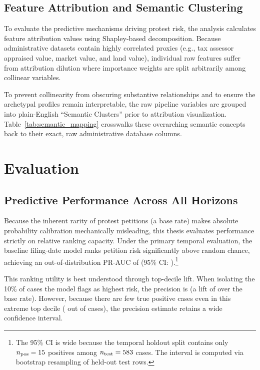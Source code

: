 \documentclass[twoside,11pt]{article}
\begin{document}
\subsection{Feature Attribution and Semantic Clustering}
\label{sec:feature_attribution}

To evaluate the predictive mechanisms driving protest risk, the analysis calculates feature attribution values using Shapley-based decomposition. Because administrative datasets contain highly correlated proxies (e.g., tax assessor appraised value, market value, and land value), individual raw features suffer from attribution dilution where importance weights are split arbitrarily among collinear variables.

To prevent collinearity from obscuring substantive relationships and to ensure the archetypal profiles remain interpretable, the raw pipeline variables are grouped into plain-English ``Semantic Clusters'' prior to attribution visualization. Table~\ref{tab:semantic_mapping} crosswalks these overarching semantic concepts back to their exact, raw administrative database columns.



\section{Evaluation}
\label{sec:results}

\subsection{Predictive Performance Across All Horizons}

Because the inherent rarity of protest petitions (a \metricBaseRate{} base rate) makes absolute probability calibration mechanically misleading, this thesis evaluates performance strictly on relative ranking capacity. Under the primary temporal evaluation, the baseline filing-date model ranks petition risk significantly above random chance, achieving an out-of-distribution PR-AUC of \metricBootstrapFiling{} (95\% CI: \metricBootstrapFilingCI{}).\footnote{The 95\% CI is wide because the temporal holdout split contains only $n_{\text{pos}} = 15{}$ positives among $n_{\text{test}}=583{}$ cases. The interval is computed via bootstrap resampling of held-out test rows.}

This ranking utility is best understood through top-decile lift. When isolating the 10\% of cases the model flags as highest risk, the precision is \metricTopDecilePrecision{} (a lift of \metricTopDecileLift{} over the base rate). However, because there are few true positive cases even in this extreme top decile (\metricTopDecileTP{} out of \metricTopDecileN{} cases), the precision estimate retains a wide confidence interval.
\end{document}
